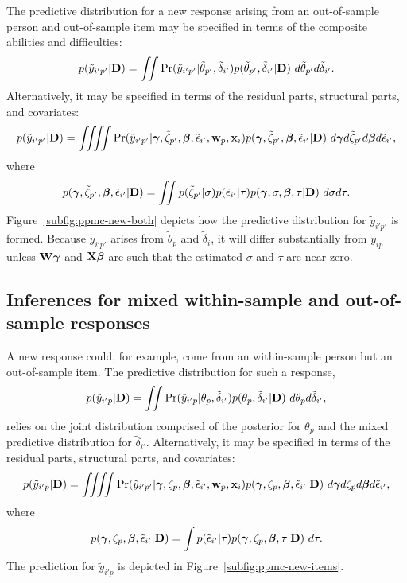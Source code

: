 \documentclass[12pt, letterpaper]{article}
\begin{document}
The predictive distribution for a new response arising from an out-of-sample person and out-of-sample item may be specified in terms of the composite abilities and difficulties:
\begin{equation}
	p(\tilde y_{i'p'} | \mathbf{D}) =
	\iint
		\Pr (\tilde y_{i'p'} | \tilde \theta_{p'}, \tilde \delta_{i'})
		p(\tilde \theta_{p'}, \tilde \delta_{i'} | \mathbf{D})
	~d\tilde \theta_{p'} d \tilde \delta_{i'}
.\end{equation}
Alternatively, it may be specified in terms of the residual parts, structural parts, and covariates:
\begin{equation}
	p(\tilde y_{i'p'} | \mathbf{D}) =
	\iiiint
		\Pr (\tilde y_{i'p'} | \boldsymbol{\gamma},\tilde \zeta_{p'}, \boldsymbol{\beta}, 
			\tilde \epsilon_{i'}, \mathbf{w}_p, \mathbf{x}_i)
		p(\boldsymbol{\gamma}, \tilde \zeta_{p'}, \boldsymbol{\beta}, \tilde \epsilon_{i'} | \mathbf{D})
	~d\boldsymbol{\gamma} d \tilde \zeta_{p'} d \boldsymbol{\beta} d \tilde \epsilon_{i'}
,\end{equation}
where
\begin{equation}
	p(\boldsymbol{\gamma}, \tilde \zeta_{p'}, \boldsymbol{\beta}, \tilde \epsilon_{i'} | \mathbf{D}) = 
	\iint
		p(\tilde \zeta_{p'} | \sigma)
		p(\tilde \epsilon_{i'} | \tau)
		 p(\boldsymbol{\gamma}, \sigma, \boldsymbol{\beta}, \tau | \mathbf{D})
	~d \sigma d \tau
.\end{equation}
Figure~\ref{subfig:ppmc-new-both} depicts how the predictive distribution for $\tilde y_{i'p'}$ is formed. Because $\tilde y_{i'p'}$ arises from $\tilde \theta_p$ and $\tilde \delta_i$, it will differ substantially from $y_{ip}$ unless $\mathbf{W} \boldsymbol{\gamma}$ and $\mathbf{X} \boldsymbol{\beta}$ are such that the estimated $\sigma$ and $\tau$ are near zero.


\subsection{Inferences for mixed within-sample and out-of-sample responses}

A new response could, for example, come from an within-sample person but an out-of-sample item. The predictive distribution for such a response,
\begin{equation}
	p(\tilde y_{i'p} | \mathbf{D}) = 
	\iint
		\Pr (\tilde y_{i'p} | \theta_{p}, \tilde \delta_{i'})
		p(\theta_{p}, \tilde \delta_{i'} | \mathbf{D})
	~d \theta_{p} d \tilde \delta_{i'}
,\end{equation}
relies on the joint distribution comprised of the posterior for $\theta_{p}$ and the mixed predictive distribution for $\tilde \delta_{i'}$.
Alternatively, it may be specified in terms of the residual parts, structural parts, and covariates:
\begin{equation}
	p(\tilde y_{i'p} | \mathbf{D}) =
	\iiiint
		\Pr (\tilde y_{i'p'} | \boldsymbol{\gamma},\zeta_{p}, \boldsymbol{\beta}, \tilde \epsilon_{i'}, 
			\mathbf{w}_p, \mathbf{x}_i)
		p(\boldsymbol{\gamma}, \zeta_{p}, \boldsymbol{\beta}, \tilde \epsilon_{i'} | \mathbf{D})
	~d\boldsymbol{\gamma} d \zeta_{p} d \boldsymbol{\beta} d \tilde \epsilon_{i'}
,\end{equation}
where
\begin{equation}
	p(\boldsymbol{\gamma}, \zeta_{p}, \boldsymbol{\beta}, \tilde \epsilon_{i'} | \mathbf{D}) = 
	\int
		p(\tilde \epsilon_{i'} | \tau)
		p(\boldsymbol{\gamma}, \zeta_p, \boldsymbol{\beta}, \tau | \mathbf{D})
	~d \tau
.\end{equation}
The prediction for $\tilde y_{i'p}$ is depicted in Figure~\ref{subfig:ppmc-new-items}. 
\end{document}
